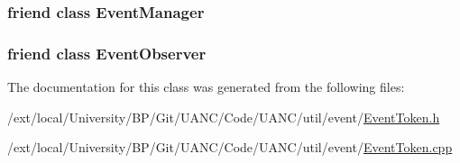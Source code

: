 \subsubsection[{\texorpdfstring{Event\+Manager}{EventManager}}]{\setlength{\rightskip}{0pt plus 5cm}friend class {\bf Event\+Manager}\hspace{0.3cm}{\ttfamily [friend]}}\hypertarget{classuanc_1_1util_1_1event_1_1_event_token_aba45a46c615e2683daffdae82e2d3b8f}{}\label{classuanc_1_1util_1_1event_1_1_event_token_aba45a46c615e2683daffdae82e2d3b8f}
\subsubsection[{\texorpdfstring{Event\+Observer}{EventObserver}}]{\setlength{\rightskip}{0pt plus 5cm}friend class {\bf Event\+Observer}\hspace{0.3cm}{\ttfamily [friend]}}\hypertarget{classuanc_1_1util_1_1event_1_1_event_token_a7512992e19dc2f4613dea5e056e626f9}{}\label{classuanc_1_1util_1_1event_1_1_event_token_a7512992e19dc2f4613dea5e056e626f9}


The documentation for this class was generated from the following files\+:\begin{DoxyCompactItemize}
\item 
/ext/local/\+University/\+B\+P/\+Git/\+U\+A\+N\+C/\+Code/\+U\+A\+N\+C/util/event/\hyperlink{_event_token_8h}{Event\+Token.\+h}\item 
/ext/local/\+University/\+B\+P/\+Git/\+U\+A\+N\+C/\+Code/\+U\+A\+N\+C/util/event/\hyperlink{_event_token_8cpp}{Event\+Token.\+cpp}\end{DoxyCompactItemize}
